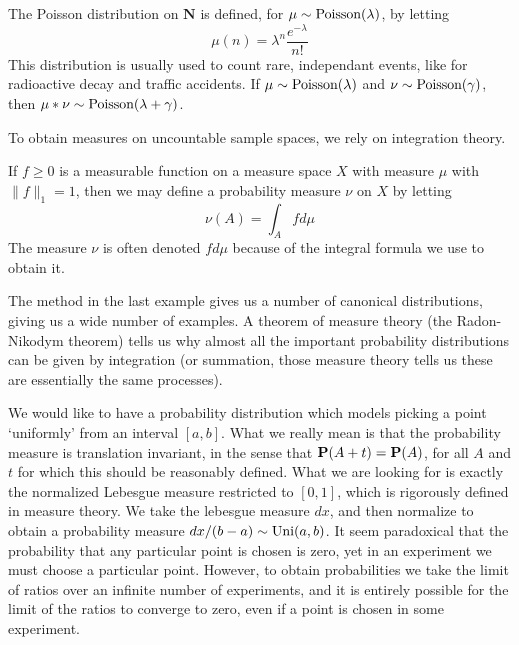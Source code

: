 \begin{example}
    The Poisson distribution on $\mathbf{N}$ is defined, for $\mu \sim \operatorname{\text{Poisson}}(\lambda)$, by letting
    \[ \mu(n) = \lambda^n \frac{e^{-\lambda}}{n!} \]
    This distribution is usually used to count rare, independant events, like for radioactive decay and traffic accidents. If $\mu \sim \operatorname{\text{Poisson}}(\lambda)$ and $\nu \sim \operatorname{\text{Poisson}}(\gamma)$, then $\mu * \nu \sim \operatorname{\text{Poisson}}(\lambda + \gamma)$.
\end{example}

To obtain measures on uncountable sample spaces, we rely on integration theory.

\begin{example}
    If $f \geq 0$ is a measurable function on a measure space $X$ with measure $\mu$ with $\| f \|_1 = 1$, then we may define a probability measure $\nu$ on $X$ by letting
    \[ \nu(A) = \int_A f d\mu \]
    The measure $\nu$ is often denoted $f d\mu$ because of the integral formula we use to obtain it.
\end{example}

The method in the last example gives us a number of canonical distributions, giving us a wide number of examples. A theorem of measure theory (the Radon-Nikodym theorem) tells us why almost all the important probability distributions can be given by integration (or summation, those measure theory tells us these are essentially the same processes).

\begin{example}
    We would like to have a probability distribution which models picking a point `uniformly' from an interval $[a,b]$. What we really mean is that the probability measure is translation invariant, in the sense that $\operatorname{\mathbf{P}}(A + t) = \operatorname{\mathbf{P}}(A)$, for all $A$ and $t$ for which this should be reasonably defined. What we are looking for is exactly the normalized Lebesgue measure restricted to $[0,1]$, which is rigorously defined in measure theory. We take the lebesgue measure $dx$, and then normalize to obtain a probability measure $dx/(b-a) \sim \operatorname{\text{Uni}}(a,b)$. It seem paradoxical that the probability that any particular point is chosen is zero, yet in an experiment we must choose a particular point. However, to obtain probabilities we take the limit of ratios over an infinite number of experiments, and it is entirely possible for the limit of the ratios to converge to zero, even if a point is chosen in some experiment.
\end{example}

